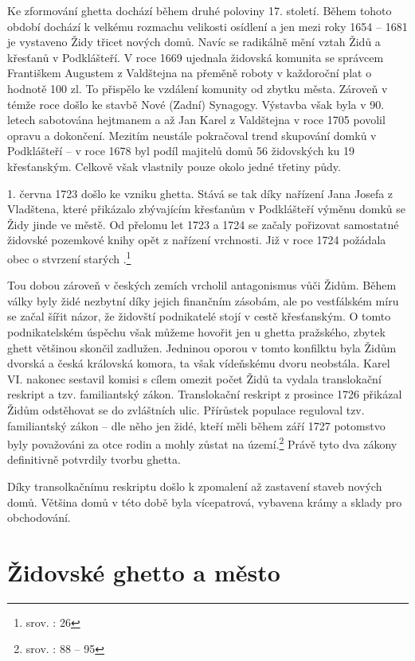 \documentclass[a4paper,oneside,12p]{report}
\begin{document}
Ke zformování ghetta dochází během druhé poloviny 17. století.
Během tohoto období dochází k velkému rozmachu velikosti osídlení a jen mezi roky 1654 -- 1681 je vystaveno Židy třicet nových domů.
Navíc se radikálně mění vztah Židů a křesťanů v Podklášteří.
V roce 1669 ujednala židovská komunita se správcem Františkem Augustem z Valdštejna na přeměně roboty v každoroční plat o hodnotě 100 zl.
To přispělo ke vzdálení komunity od zbytku města.
Zároveň v témže roce došlo ke stavbě Nové (Zadní) Synagogy.
Výstavba však byla v 90. letech sabotována hejtmanem a až Jan Karel z Valdštejna v roce 1705 povolil opravu a dokončení.
Mezitím neustále pokračoval trend skupování domků v Podklášteří -- v roce 1678 byl podíl majitelů domů 56 židovských ku 19 křesťanským.
Celkově však vlastnily pouze okolo jedné třetiny půdy.

1. června 1723 došlo ke vzniku ghetta.
Stává se tak díky nařízení Jana Josefa z Vladštena, které přikázalo zbývajícím křesťanům v Podklášteří výměnu domků se Židy jinde ve městě.
Od přelomu let 1723 a 1724 se začaly pořizovat samostatné židovské pozemkové knihy opět z nařízení vrchnosti.
Již v roce 1724 požádala obec o stvrzení starých .\footnote{srov. \cite{Fiser2005}: 26}

Tou dobou zároveň v českých zemích vrcholil antagonismus vůči Židům.
Během války byly židé nezbytní díky jejich finančním zásobám, ale po vestfálském míru se začal šířit názor, že židovští podnikatelé stojí v cestě křesťanským.
O tomto podnikatelském úspěchu však můžeme hovořit jen u ghetta pražského, zbytek ghett většinou skončil zadlužen.
Jedninou oporou v tomto konfilktu byla Židům dvorská a česká královská komora, ta však vídeňskému dvoru neobstála.
Karel VI. nakonec sestavil komisi s cílem omezit počet Židů ta vydala translokační reskript a tzv. familiantský zákon.
Translokační reskript z prosince 1726 přikázal Židům odstěhovat se do zvláštních ulic.
Přírůstek populace reguloval tzv. familiantský zákon -- dle něho jen židé, kteří měli během září 1727 potomstvo byly považováni za otce rodin a mohly zůstat na území.\footnote{srov. \cite{Uhlir1978}: 88 -- 95}
Právě tyto dva zákony definitivně potvrdily tvorbu ghetta.

Díky transolkačnímu reskriptu došlo k zpomalení až zastavení staveb nových domů.
Většina domů v této době byla vícepatrová, vybavena krámy a sklady pro obchodování.

\section{Židovské ghetto a město}
\end{document}
